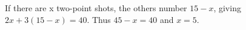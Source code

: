 If there are x two-point shots, the others number $15-x$, giving $2x+3(15-x)=40$. Thus $45-x=40$ and $\boxed{x=5}$.
